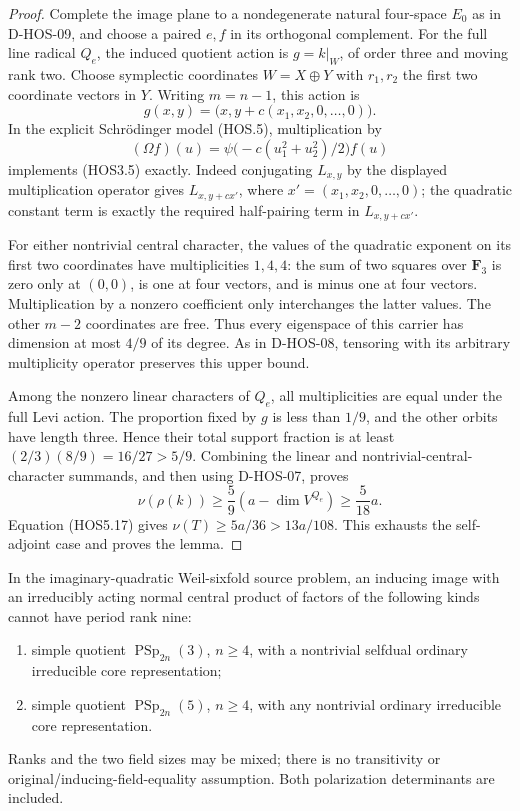 \begin{proof}
Complete the image plane to a nondegenerate natural four-space
$E_0$ as in D-HOS-09, and choose a paired $e,f$ in its
orthogonal complement. For the full line radical $Q_e$, the
induced quotient action is $g=k|_W$, of order three and moving
rank two. Choose symplectic coordinates $W=X\oplus Y$ with
$r_1,r_2$ the first two coordinate vectors in $Y$. Writing
$m=n-1$, this action is
\[
 g(x,y)=\bigl(x,y+c(x_1,x_2,0,\ldots,0)\bigr).
                                                               \tag{HOS3.5}
\]
In the explicit Schr\"odinger model (HOS.5), multiplication by
\[
 (\Omega f)(u)=
   \psi\bigl(-c(u_1^2+u_2^2)/2\bigr)f(u)
                                                               \tag{HOS3.6}
\]
implements (HOS3.5) exactly. Indeed conjugating $L_{x,y}$ by
the displayed multiplication operator gives $L_{x,y+cx'}$,
where $x'=(x_1,x_2,0,\ldots,0)$; the quadratic constant term
is exactly the required half-pairing term in $L_{x,y+cx'}$.

For either nontrivial central character, the values of the
quadratic exponent on its first two coordinates have
multiplicities $1,4,4$: the sum of two squares over
$\mathbf F_3$ is zero only at $(0,0)$, is one at four
vectors, and is minus one at four vectors. Multiplication by
a nonzero coefficient only interchanges the latter values.
The other $m-2$ coordinates are free. Thus every eigenspace
of this carrier has dimension at most $4/9$ of its degree.
As in D-HOS-08, tensoring with its arbitrary multiplicity
operator preserves this upper bound.

Among the nonzero linear characters of $Q_e$, all
multiplicities are equal under the full Levi action. The
proportion fixed by $g$ is less than $1/9$, and the other
orbits have length three. Hence their total support fraction
is at least $(2/3)(8/9)=16/27>5/9$. Combining the linear and
nontrivial-central-character summands, and then using
D-HOS-07, proves
\[
              \nu(\rho(k))\ge\frac59(a-\dim V^{Q_e})
                                     \ge\frac5{18}a.
                                                               \tag{HOS3.7}
\]
Equation (HOS5.17) gives $\nu(T)\ge5a/36>13a/108$.
This exhausts the self-adjoint case and proves the lemma.
\end{proof}

\begin{theorem}
\label{D-HOS-12}
In the imaginary-quadratic Weil-sixfold source problem, an inducing
image with an irreducibly acting normal central product of factors
of the following kinds cannot have period rank nine:
\begin{enumerate}
\item simple quotient $\operatorname{PSp}_{2n}(3)$, $n\ge4$,
with a nontrivial selfdual ordinary irreducible core representation;
\item simple quotient $\operatorname{PSp}_{2n}(5)$, $n\ge4$,
with any nontrivial ordinary irreducible core representation.
\end{enumerate}
Ranks and the two field sizes may be mixed; there is no transitivity
or original/inducing-field-equality assumption. Both polarization
determinants are included.
\end{theorem}

